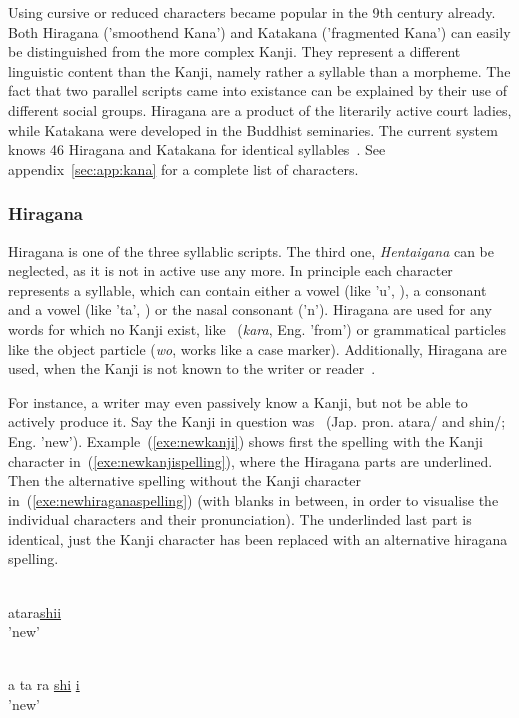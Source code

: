 Using cursive or reduced characters became popular in the 9th century already.
Both Hiragana ('smoothend Kana') and Katakana ('fragmented Kana') can easily be 
distinguished from the more complex Kanji. They represent a different linguistic 
content than the Kanji, namely rather a syllable than a morpheme.
The fact that two parallel scripts came into existance can be explained by 
their use of different social groups. Hiragana are a product of the literarily 
active court ladies, while Katakana were developed in the Buddhist seminaries.
The current system knows 46 Hiragana and Katakana for identical 
syllables~. See appendix~\ref{sec:app:kana} for a 
complete list of characters.

\subsubsection{Hiragana }
\label{sec:hiragana}

Hiragana is one of the three syllablic scripts. The third one, 
\emph{Hentaigana} can be neglected, as it is not in active use any more. %
In principle each character represents a syllable, which can contain either a 
vowel (like 'u', ), a consonant and a vowel (like 'ta', ) or the 
nasal consonant  ('n').
Hiragana are used for any words for which no Kanji exist, like 
~(\emph{kara}, Eng. 'from') or grammatical particles like the object 
particle  (\emph{wo}, works like a case marker).
Additionally, Hiragana are used, when the Kanji is not known to the writer or 
reader~. 

For instance, a writer may even passively know a Kanji, but not be able
to actively produce it. Say the Kanji in question was ~(Jap. pron. 
atara/ and shin/; Eng. 'new'). Example~(\ref{exe:newkanji})
shows first the spelling with the Kanji character 
in~(\ref{exe:newkanjispelling}), where the Hiragana parts are underlined.
Then the alternative spelling without the Kanji character 
in~(\ref{exe:newhiraganaspelling}) (with blanks in between, in order to visualise
the individual characters and their pronunciation). The underlinded last part is 
identical, just the Kanji character has been replaced with an alternative 
hiragana spelling.
\begin{exe}
\ex \label{exe:newkanji}
\begin{xlist}
\ex \label{exe:newkanjispelling}
\gll {}\underline{} \\
atara\underline{shii} \\
\trans 'new'

\ex \label{exe:newhiraganaspelling}
\gll {}   \underline{} \underline{} \\
a ta ra \underline{shi} \underline{i} \\
\trans 'new'
\end{xlist}
\end{exe}

